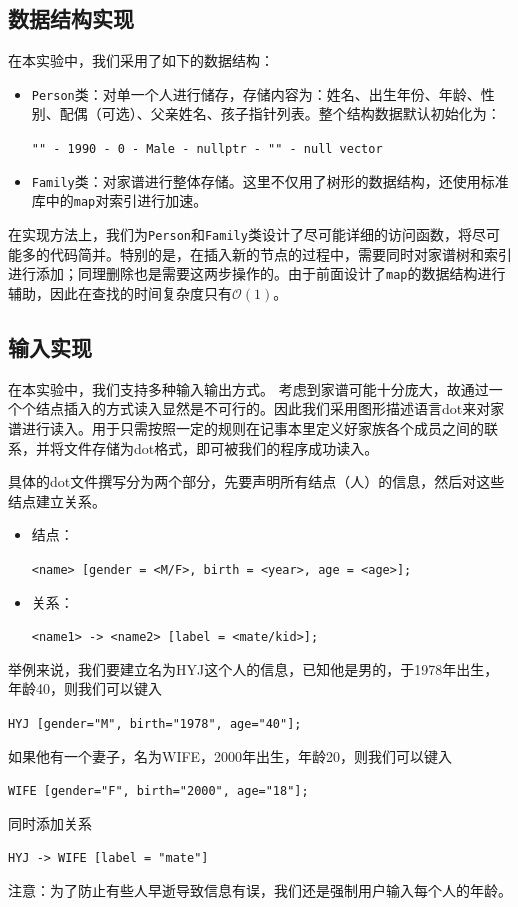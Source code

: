 \documentclass[12pt,UTF8]{ctexart}
\begin{document}
\begin{spacing}{1.4}
\subsection{数据结构实现}
	在本实验中，我们采用了如下的数据结构：
	\begin{itemize}
		\item \verb'Person'类：对单一个人进行储存，存储内容为：姓名、出生年份、年龄、性别、配偶（可选）、父亲姓名、孩子指针列表。整个结构数据默认初始化为：
		\begin{center}\verb'"" - 1990 - 0 - Male - nullptr - "" - null vector'\end{center}
		\item \verb'Family'类：对家谱进行整体存储。这里不仅用了树形的数据结构，还使用标准库中的\verb'map'对索引进行加速。
	\end{itemize}

	在实现方法上，我们为\verb'Person'和\verb'Family'类设计了尽可能详细的访问函数，将尽可能多的代码简并。特别的是，在插入新的节点的过程中，需要同时对家谱树和索引进行添加；同理删除也是需要这两步操作的。由于前面设计了\verb'map'的数据结构进行辅助，因此在查找的时间复杂度只有$\mathcal{O}(1)$。

\subsection{输入实现}
	在本实验中，我们支持多种输入输出方式。
	考虑到家谱可能十分庞大，故通过一个个结点插入的方式读入显然是不可行的。因此我们采用图形描述语言dot来对家谱进行读入。用于只需按照一定的规则在记事本里定义好家族各个成员之间的联系，并将文件存储为dot格式，即可被我们的程序成功读入。

	具体的dot文件撰写分为两个部分，先要声明所有结点（人）的信息，然后对这些结点建立关系。
	\begin{itemize}
		\item 结点：
		\begin{center}\verb'<name> [gender = <M/F>, birth = <year>, age = <age>];'\end{center}
		\item 关系：
		\begin{center}\verb'<name1> -> <name2> [label = <mate/kid>];'\end{center}
	\end{itemize}
	举例来说，我们要建立名为HYJ这个人的信息，已知他是男的，于1978年出生，年龄40，则我们可以键入
	\begin{center}\verb'HYJ [gender="M", birth="1978", age="40"];'\end{center}
	如果他有一个妻子，名为WIFE，2000年出生，年龄20，则我们可以键入
	\begin{center}\verb'WIFE [gender="F", birth="2000", age="18"];'\end{center}
	同时添加关系
	\begin{center}\verb'HYJ -> WIFE [label = "mate"]'\end{center}
	注意：为了防止有些人早逝导致信息有误，我们还是强制用户输入每个人的年龄。


\end{spacing}
\end{document}
